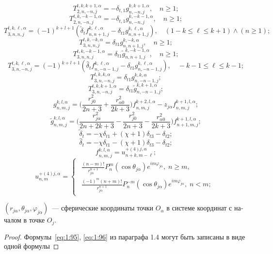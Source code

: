 \begin{russian}
\begin{theorem}
\[T_{2,n, - n,j}^{t,k,k+1,\alpha } =  - {\delta _{t,1}}{g}_{n, - n,j}^{k,k + 1,\alpha },\quad n\ge 1;\]
\[T_{2,n, - n,j}^{t,k,-k-1,\alpha } =  - {\delta _{t,1}}{g}_{n, - n,j}^{k,-k-1,\alpha },\quad n\ge 1;\]
\[T_{3,n,n,j}^{t,k,\ell ,\alpha } = (-1)^{k+l+1}({\tilde \delta _t}{f}_{n,n + 1,j}^{k,\ell ,\alpha } - {\delta _{t1}}{g}_{n,n + 1,j}^{k,\ell ,\alpha }),\quad (1 - k \le \ell  \le k + 1) \wedge (n \ge 1);\]
\[T_{3,n,n,j}^{t,k, - k,\alpha } =  {\delta _{t1}}{g}_{n,n + 1,j}^{k, - k,\alpha },\quad n\ge 1;\]
\[T_{3,n,n,j}^{t,k, - k - 1,\alpha } = {\delta _{t1}}{\tilde g}_{n,n+1,j}^{k, - k - 1,\alpha },\quad n\ge 1;\]
\[T_{3,n, - n,j}^{t,k,\ell ,\alpha } = (-1)^{k+l+1}({\hat \delta _t}{f}_{n, - n - 1,j}^{k,\ell ,\alpha } - {\delta _{t1}}{g}_{n, - n - 1,j}^{k,\ell ,\alpha }),\quad - k - 1 \le \ell  \le k - 1;\]
\[T_{3,n, - n,j}^{t,k,k,\alpha } = {\delta _{t1}}{g}_{n, - n - 1,j}^{k,k,\alpha };\]
\[T_{3,n, - n,j}^{t,k,k + 1,\alpha } = {\delta _{t1}}{\tilde g}_{n,-n-1,j}^{k,k + 1,\alpha };\]
\[g_{n,m,j}^{k,l,\alpha}=\bigg(\frac{r_{j0}^2}{2n+3}+\frac{r_{\alpha 0}^2}{2k+3}\bigg)f_{n,m,j}^{k+2,l,\alpha}-z_{j\alpha}f_{n,m,j}^{k+1,l,\alpha};\]
\[{\tilde g}_{n,m,j}^{k,l,\alpha}=\bigg(\frac{r_{j\alpha}^2}{2n+2k+3}-\frac{r_{j0}^2}{2n+3}-\frac{r_{\alpha 0}^2}{2k+3}\bigg)f_{n+1,m,j}^{k+1,l,\alpha};\]
\[{\tilde \delta _t} =  - \chi {\delta _{t1}} + (\chi  + 1){\delta _{t3}} - {\delta _{t2}};\]
\[{\hat \delta _t} =  - \chi {\delta _{t1}} - (\chi  + 1){\delta _{t3}} - {\delta _{t2}};\]
\[{f}_{n,m,j}^{k,l,\alpha } = {u}_{n+k,m - \ell }^{ + (4)j,\alpha };\]
\[{{u}}_{n,m}^{ + (4)j,\alpha } = \left\{ {\begin{array}{*{20}{l}}
\begin{array}{l}
\frac{{(n - m)!}}{{r_{j\alpha }^{n + 1}}}P_n^m(\cos {\theta _{j\alpha }}){e^{im{\varphi _{j\alpha }}}},\;n \ge m,\\
\frac{{{{( - 1)}^m}(n + m)!}}{{r_{j\alpha }^{n + 1}}}P_n^{ - m}(\cos {\theta _{j\alpha }}){e^{im{\varphi _{j\alpha }}}},\;n < m;
\end{array}
\end{array}} \right.\]

\noindent $(r_{j\alpha},\theta_{j\alpha},\varphi_{j\alpha})$~--- сферические координаты точки $O_\alpha$ в системе координат с началом в точке $O_j$.
\end{theorem}

\begin{proof}
Формулы~\eqref{eq:1:95}, \eqref{eq:1:96} из параграфа 1.4 могут быть записаны в виде одной формулы


\end{proof}
\end{russian}

